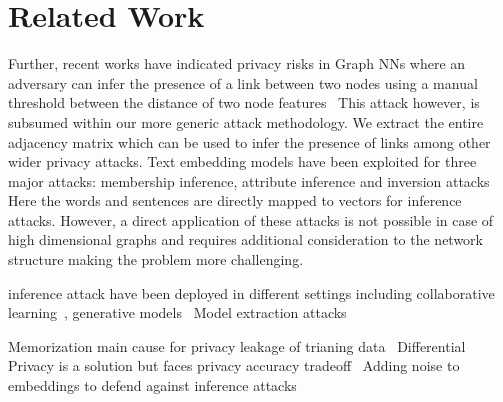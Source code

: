 \section{Related Work}\label{related}

Further, recent works have indicated privacy risks in Graph NNs where an adversary can infer the presence of a link between two nodes using a manual threshold between the distance of two node features~\cite{linksteal}
This attack however, is subsumed within our more generic attack methodology. We extract the entire adjacency matrix which can be used to infer the presence of links among other wider privacy attacks.
Text embedding models have been exploited for three major attacks: membership inference, attribute inference and inversion attacks~\cite{textembleak,nlp}
Here the words and sentences are directly mapped to vectors for inference attacks.
However, a direct application of these attacks is not possible in case of high dimensional graphs and requires additional consideration to the network structure making the problem more challenging.

inference attack have been deployed in different settings including collaborative learning~\cite{whitebox,collabinf}, generative models~\cite{logan}
Model extraction attacks~\cite{timing,csinn,stealml}


Memorization main cause for privacy leakage of trianing data~\cite{memorize,secretsharer,overlearninginf}
Differential Privacy is a solution but faces privacy accuracy tradeoff~\cite{diffpriv}
Adding noise to embeddings to defend against inference attacks~\cite{attriguard}
